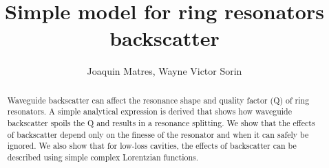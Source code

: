 \documentclass[10pt]{article}
\begin{document}
\title{Simple model for ring resonators backscatter}
\author{Joaquin Matres, Wayne Victor Sorin} %
\address{Hewlett Packard Labs, 1501 Page Mill Road, Palo Alto, CA 94304} %


\begin{abstract}
Waveguide backscatter can affect the resonance shape and quality factor (Q) of ring resonators.  A simple analytical expression is derived that shows how waveguide backscatter spoils the Q and results in a resonance splitting.   We show that the effects of backscatter depend only on the finesse of the resonator and when it can safely be ignored.  We also show that for low-loss cavities, the effects of backscatter can be described using  simple complex Lorentzian functions.
\end{abstract}

\end{document}

